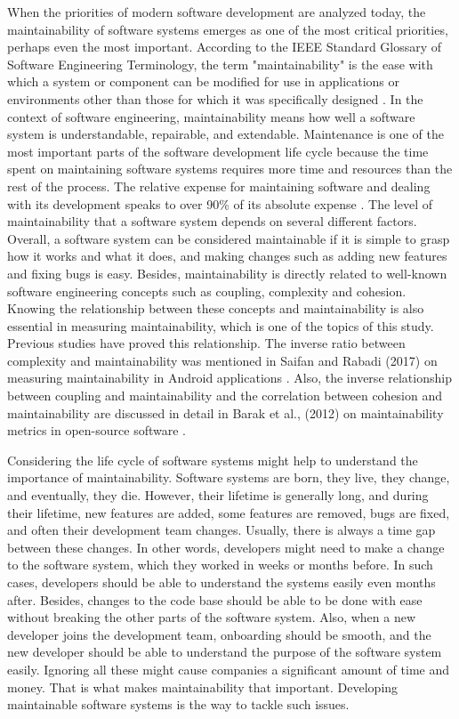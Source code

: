 When the priorities of modern software development are analyzed today, the maintainability of software systems emerges as one of the most critical priorities, perhaps even the most important. According to the IEEE Standard Glossary of Software Engineering Terminology, the term "maintainability" is the ease with which a system or component can be modified for use in applications or environments other than those for which it was specifically designed \cite{20}. In the context of software engineering, maintainability means how well a software system is understandable, repairable, and extendable. Maintenance is one of the most important parts of the software development life cycle because the time spent on maintaining software systems requires more time and resources than the rest of the process. The relative expense for maintaining software and dealing with its development speaks to over 90\% of its absolute expense \cite{4}. The level of maintainability that a software system depends on several different factors. Overall, a software system can be considered maintainable if it is simple to grasp how it works and what it does, and making changes such as adding new features and fixing bugs is easy. Besides, maintainability is directly related to well-known software engineering concepts such as coupling, complexity and cohesion. Knowing the relationship between these concepts and maintainability is also essential in measuring maintainability, which is one of the topics of this study. Previous studies have proved this relationship. The inverse ratio between complexity and maintainability was mentioned in Saifan and Rabadi (2017) on measuring maintainability in Android applications \cite{34}. Also, the inverse relationship between coupling and maintainability and the correlation between cohesion and maintainability are discussed in detail in Barak et al., (2012) on maintainability metrics in open-source software \cite{33}.

Considering the life cycle of software systems might help to understand the importance of maintainability. Software systems are born, they live, they change, and eventually, they die. However, their lifetime is generally long, and during their lifetime, new features are added, some features are removed, bugs are fixed, and often their development team changes. Usually, there is always a time gap between these changes. In other words, developers might need to make a change to the software system, which they worked in weeks or months before. In such cases, developers should be able to understand the systems easily even months after. Besides, changes to the code base should be able to be done with ease without breaking the other parts of the software system. Also, when a new developer joins the development team, onboarding should be smooth, and the new developer should be able to understand the purpose of the software system easily. Ignoring all these might cause companies a significant amount of time and money. That is what makes maintainability that important. Developing maintainable software systems is the way to tackle such issues.

